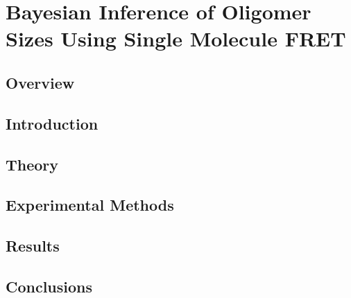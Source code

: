\chapter{Bayesian Inference of Oligomer Sizes Using Single Molecule FRET}
\section{Overview}
\section{Introduction}
\section{Theory}
\section{Experimental Methods}
\section{Results}
\section{Conclusions}